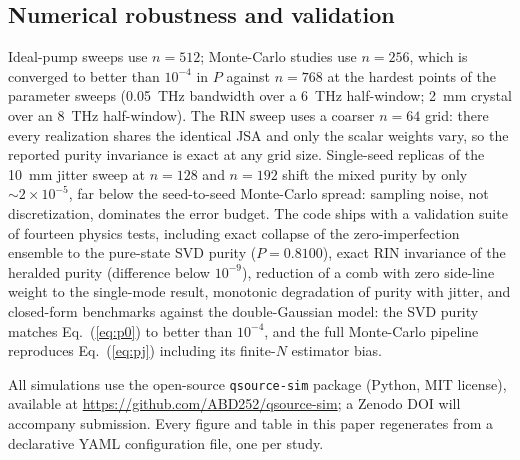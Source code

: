 \subsection{Numerical robustness and validation}

Ideal-pump sweeps use $n = 512$; Monte-Carlo studies use $n = 256$,
which is converged to better than $10^{-4}$ in $P$ against $n = 768$
at the hardest points of the parameter sweeps (0.05~THz bandwidth over
a 6~THz half-window; 2~mm crystal over an 8~THz half-window). The RIN
sweep uses a coarser $n = 64$ grid: there every realization shares the
identical JSA and only the scalar weights vary, so the reported purity
invariance is exact at any grid size. Single-seed replicas of the
10~mm jitter sweep at $n = 128$ and $n = 192$ shift the mixed purity
by only $\sim 2\times10^{-5}$, far below the seed-to-seed Monte-Carlo
spread: sampling noise, not discretization, dominates the error
budget. The code ships with a validation suite of fourteen physics
tests, including exact collapse of the zero-imperfection ensemble to
the pure-state SVD purity ($P = 0.8100$), exact RIN invariance of the
heralded purity (difference below $10^{-9}$), reduction of a comb with
zero side-line weight to the single-mode result, monotonic degradation
of purity with jitter, and closed-form benchmarks against the
double-Gaussian model: the SVD purity matches Eq.~(\ref{eq:p0}) to
better than $10^{-4}$, and the full Monte-Carlo pipeline reproduces
Eq.~(\ref{eq:pj}) including its finite-$N$ estimator bias.

All simulations use the open-source \texttt{qsource-sim} package
(Python, MIT license), available at
\url{https://github.com/ABD252/qsource-sim}; a Zenodo DOI will
accompany submission. Every figure and table in this paper regenerates
from a declarative YAML configuration file, one per study.
